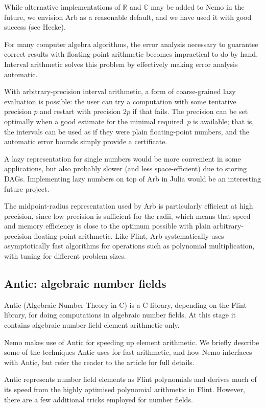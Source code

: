 \documentclass{sig-alternate-05-2015}
\begin{document}
While alternative implementations of $\mathbb{R}$ and $\mathbb{C}$
may be added to Nemo in the future, we envision Arb as a reasonable default,
and we have used it with good success (see Hecke).

For many computer algebra algorithms, the error analysis
necessary to guarantee correct results with floating-point arithmetic
becomes impractical to do by hand.
Interval arithmetic solves this problem by effectively making
error analysis automatic.

With arbitrary-precision interval arithmetic, a form of
coarse-grained lazy evaluation is possible: the user can
try a computation with some tentative precision $p$ and restart
with precision $2p$ if that fails. The precision can be set
optimally when a good estimate for the minimal
required~$p$ is available; that is, the intervals
can be used as if they were plain floating-point numbers, and the automatic
error bounds simply provide a certificate.

A lazy representation for single numbers would be more convenient in some
applications,
but also probably slower (and less space-efficient) due to storing DAGs.
Implementing lazy numbers on top of Arb in Julia
would be an interesting future project.

The midpoint-radius representation used by Arb is particularly efficient
at high precision,
since low precision is sufficient for the radii, which means that
speed and memory efficiency is close to the optimum possible
with plain arbitrary-precision floating-point arithmetic.
Like Flint, Arb systematically uses asymptotically fast algorithms
for operations such as polynomial multiplication, with tuning
for different problem sizes.

\subsection{Antic: algebraic number fields}

Antic (Algebraic Number Theory in C) is a C library, depending on the Flint library, for
doing computations in algebraic number fields. At this stage it contains algebraic number
field element arithmetic only.

Nemo makes use of Antic for speeding up element arithmetic. We briefly describe some
of the techniques Antic uses for fast arithmetic, and how Nemo interfaces with Antic, but
refer the reader to the article \cite{anticrundbrief} for full details.

Antic represents number field elements as Flint polynomials and derives much of its speed
from the highly optimised polynomial arithmetic in Flint. However, there are a few
additional tricks employed for number fields.
\end{document}
